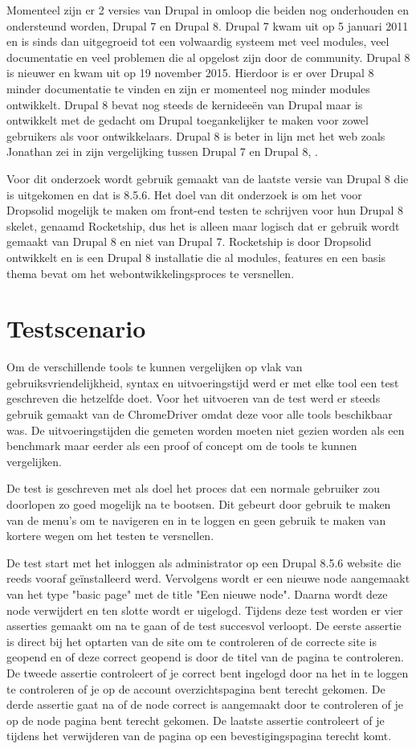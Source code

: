 Momenteel zijn er 2 versies van Drupal in omloop die beiden nog onderhouden en ondersteund worden, Drupal 7 en Drupal 8. Drupal 7 kwam uit op 5 januari 2011 en is sinds dan uitgegroeid tot een volwaardig systeem met veel modules, veel documentatie en veel problemen die al opgelost zijn door de community. Drupal 8 is nieuwer en kwam uit op 19 november 2015. Hierdoor is er over Drupal 8 minder documentatie te vinden en zijn er momenteel nog minder modules ontwikkelt. Drupal 8 bevat nog steeds de kernideeën van Drupal maar is ontwikkelt met de gedacht om Drupal toegankelijker te maken voor zowel gebruikers als voor ontwikkelaars. Drupal 8 is beter in lijn met het web zoals Jonathan zei in zijn vergelijking tussen Drupal 7 en Drupal 8, \cite{Ramael2015}.

Voor dit onderzoek wordt gebruik gemaakt van de laatste versie van Drupal 8 die is uitgekomen en dat is 8.5.6. Het doel van dit onderzoek is om het voor Dropsolid mogelijk te maken om front-end testen te schrijven voor hun Drupal 8 skelet, genaamd Rocketship, dus het is alleen maar logisch dat er gebruik wordt gemaakt van Drupal 8 en niet van Drupal 7. Rocketship is door Dropsolid ontwikkelt en is een Drupal 8 installatie die al modules, features en een basis thema bevat om het webontwikkelingsproces te versnellen.

\section{Testscenario}
Om de verschillende tools te kunnen vergelijken op vlak van gebruiksvriendelijkheid, syntax en uitvoeringstijd werd er met elke tool een test geschreven die hetzelfde doet. Voor het uitvoeren van de test werd er steeds gebruik gemaakt van de ChromeDriver omdat deze voor alle tools beschikbaar was. De uitvoeringstijden die gemeten worden moeten niet gezien worden als een benchmark maar eerder als een proof of concept om de tools te kunnen vergelijken.

De test is geschreven met als doel het proces dat een normale gebruiker zou doorlopen zo goed mogelijk na te bootsen. Dit gebeurt door gebruik te maken van de menu's om te navigeren en in te loggen en geen gebruik te maken van kortere wegen om het testen te versnellen.

De test start met het inloggen als administrator op een Drupal 8.5.6 website die reeds vooraf geïnstalleerd werd. Vervolgens wordt er een nieuwe node aangemaakt van het type "basic page" met de title "Een nieuwe node". Daarna wordt deze node verwijdert en ten slotte wordt er uigelogd. Tijdens deze test worden er vier asserties gemaakt om na te gaan of de test succesvol verloopt. De eerste assertie is direct bij het optarten van de site om te controleren of de correcte site is geopend en of deze correct geopend is door de titel van de pagina te controleren. De tweede assertie controleert of je correct bent ingelogd door na het in te loggen te controleren of je op de account overzichtspagina bent terecht gekomen. De derde assertie gaat na of de node correct is aangemaakt door te controleren of je op de node pagina bent terecht gekomen. De laatste assertie controleert of je tijdens het verwijderen van de pagina op een bevestigingspagina terecht komt.

